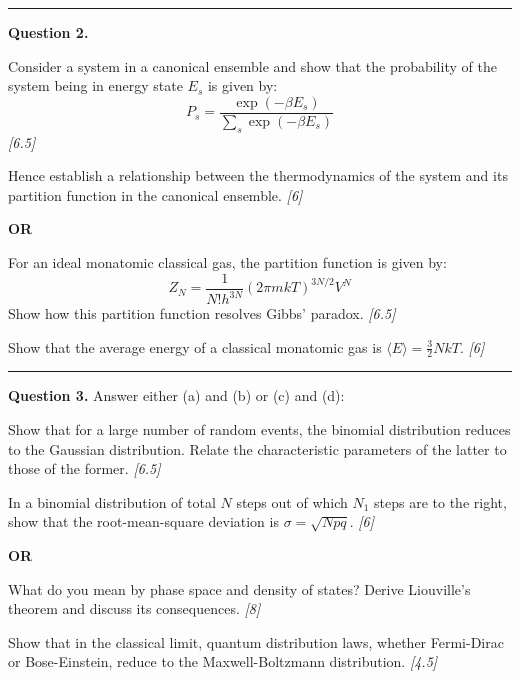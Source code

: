 \documentclass[11pt,a4paper]{article}
\newcommand{\pts}[1]{\hfill   \textit{[#1]}}
\begin{document}
\medskip\rule{\linewidth}{0.2pt}




\noindent   \textbf{Question 2.}

\begin{parts}
  \item Consider a system in a canonical ensemble and show that the probability of the system being in energy state $E_s$ is given by:
    \[ P_s = \frac{\exp(-\beta E_s)}{\sum_s \exp(-\beta E_s)} \] \pts{6.5}
  \item Hence establish a relationship between the thermodynamics of the system and its partition function in the canonical ensemble. \pts{6}
\end{parts}
\hfill   \textbf{OR}

\begin{parts}
  \item For an ideal monatomic classical gas, the partition function is given by:
    \[ Z_N = \frac{1}{N! h^{3N}} (2\pi m k T)^{3N/2} V^N \]
    Show how this partition function resolves Gibbs' paradox. \pts{6.5}
  \item Show that the average energy of a classical monatomic gas is $\langle E \rangle = \frac{3}{2} N k T$. \pts{6}
\end{parts}

\medskip\rule{\linewidth}{0.2pt}




\noindent   \textbf{Question 3.} Answer either (a) and (b) or (c) and (d):

\begin{parts}
  \item Show that for a large number of random events, the binomial distribution reduces to the Gaussian distribution. Relate the characteristic parameters of the latter to those of the former. \pts{6.5}
  \item In a binomial distribution of total $N$ steps out of which $N_1$ steps are to the right, show that the root-mean-square deviation is $\sigma = \sqrt{Npq}$. \pts{6}
\end{parts}
\hfill   \textbf{OR}

\begin{parts}
  \item What do you mean by phase space and density of states? Derive Liouville's theorem and discuss its consequences. \pts{8}
  \item Show that in the classical limit, quantum distribution laws, whether Fermi-Dirac or Bose-Einstein, reduce to the Maxwell-Boltzmann distribution. \pts{4.5}
\end{parts}
\end{document}
